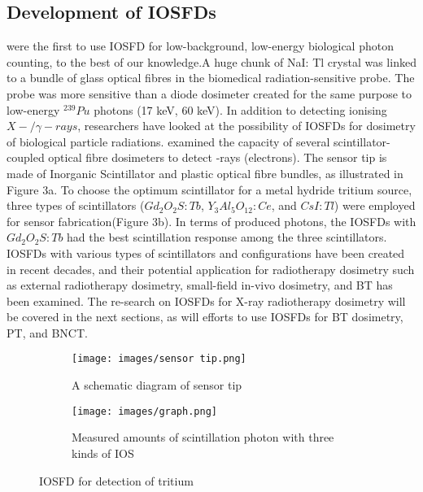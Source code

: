 \documentclass{article}
\begin{document}
\begin{multicols}{2}
\section{Development of IOSFDs}
\citeauthor{swinth1976biomedical} were the first to use IOSFD for low-background, low-energy biological photon counting, to the best of our knowledge.A huge chunk of NaI: Tl crystal was linked to a bundle of glass optical fibres in the biomedical radiation-sensitive probe. The probe was more sensitive than a diode dosimeter created for the same purpose to low-energy $^{239}Pu$ photons (17 keV, 60 keV). In addition to detecting ionising $X-/\gamma-rays$, researchers have looked at the possibility of IOSFDs for dosimetry of biological particle radiations. \citeauthor{jang2011fiber} examined the capacity of several scintillator-coupled optical fibre dosimeters to detect -rays (electrons). The sensor tip is made of Inorganic Scintillator and plastic optical fibre bundles, as illustrated in Figure 3a. To choose the optimum scintillator for a metal hydride tritium source, three types of scintillators ($Gd_2O_2S:Tb$, $Y_3Al_5O_{12}:Ce$, and $CsI:Tl$) were employed for sensor fabrication(Figure 3b). In terms of produced photons, the IOSFDs with $Gd_2O_2S:Tb$ had the best scintillation response among the three scintillators. IOSFDs with various types of scintillators and configurations have been created in recent decades, and their potential application for radiotherapy dosimetry such as external radiotherapy dosimetry, small-field in-vivo dosimetry, and BT has been examined. The re-search on IOSFDs for X-ray radiotherapy dosimetry will be covered in the next sections, as will efforts to use IOSFDs for BT dosimetry, PT, and BNCT.
\end{multicols}
\begin{figure}[H]
    \begin{subfigure}{0.5\textwidth}
    \centering
    \texttt{[image: images/sensor tip.png]}
    \caption{A schematic diagram of sensor tip}
    \label{fig:fig3a}
    \end{subfigure}
    \begin{subfigure}{0.5\textwidth}
    \centering
    \texttt{[image: images/graph.png]}
    \caption{Measured amounts of scintillation photon with three kinds of IOS}
    \label{fig:fig3b}
    \end{subfigure}
    \caption{IOSFD for detection of tritium}
\end{figure}

\blindtext
\end{document}
